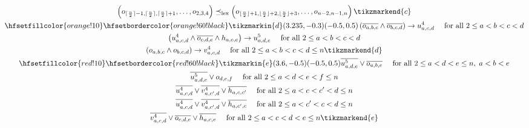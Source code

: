 \begin{figure}
\begin{spreadlines}{16pt}
\begin{gather}
    \left(\orvar_{\lceil \frac{n}{2} \rceil -1, \lceil \frac{n}{2} \rceil,\lceil \frac{n}{2} \rceil+1}, \ldots, \orvar_{2,3,4} \right) \preceq_{\text{lex}} \left(\orvar_{\lfloor \frac{n}{2}\rfloor +1,  \lfloor \frac{n}{2}\rfloor +2, \lfloor \frac{n}{2}\rfloor +3}, \ldots, \orvar_{n-2, n-1, n} \right)\tikzmarkend{c}\label{eq:constraint-6}\\ 
\hfsetfillcolor{orange!10}
\hfsetbordercolor{orange!60!black}
\tikzmarkin{d}(3.235,-0.3)(-0.5,0.5)
  \left(\ov{\orvar_{a,b,c}} \land \ov{\orvar_{b,c,d}}\right) \rightarrow \uvar_{a, c, d} \quad \text{ for all } 2 \leq a < b < c < d\label{eq:constraint-7}\\
  \left(\uvar_{a,c,d} \land \ov{\orvar_{c,d,e}} \land \hvar_{a,c,e}\right)\rightarrow \ufvar_{a, d, e} \quad \text{ for all } 2 \leq a < b < c < d\label{eq:constraint-8}\\
  \left(\orvar_{a, b, c} \land \orvar_{b, c, d}\right) \rightarrow \vvar_{a, c, d} \quad \text{ for all } 2 \leq a < b < c < d \leq n \tikzmarkend{d}\label{eq:constraint-9}\\
\hfsetfillcolor{red!10}
\hfsetbordercolor{red!60!black}
\tikzmarkin{e}(3.6,-0.5)(-0.5,0.5)
  \ov{\ufvar_{a,d,e}} \lor \ov{\orvar_{a, b, e}} \quad \text { for all } 2 \leq a < d < e \leq n, \; a < b < e\label{eq:constraint-10}\\
  \ov{\ufvar_{a,d,e}} \lor \orvar_{d, e, f} \quad \text { for all } 2 \leq a < d < e < f\leq n\label{eq:constraint-11}\\
  \ov{\uvar_{a,c,d}} \lor \ov{\vvar_{a, c', d}} \lor \ov{\hvar_{a,c,c'}} \quad \text{ for all } 2 \leq a < c < c' < d \leq n\label{eq:constraint-12}\\
  \ov{\uvar_{a,c,d}} \lor \ov{\vvar_{a, c', d}} \lor \ov{\hvar_{a,c',c}} \quad \text{ for all } 2 \leq a < c' < c < d \leq n\label{eq:constraint-13}\\
  \ov{\vvar_{a,c,d}} \lor \ov{\orvar_{c, d, e}} \lor \ov{\hvar_{a,c,e}} \quad \text{ for all } 2 \leq a < c < d < e \leq n\label{eq:constraint-14x}
\tikzmarkend{e}
  \end{gather}
\end{spreadlines}
\end{figure}
